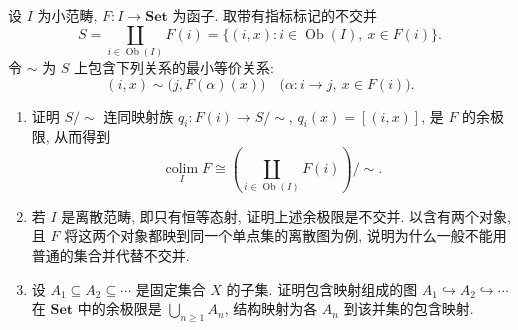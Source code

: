 \documentclass{article}
\begin{document}
\begin{problem}
设 $I$ 为小范畴, $F:I\to\mathbf{Set}$ 为函子. 取带有指标标记的不交并
\[
  S=\coprod_{i\in\operatorname{Ob}(I)}F(i)=\{(i,x):i\in\operatorname{Ob}(I),\ x\in F(i)\}.
\]
令 $\sim$ 为 $S$ 上包含下列关系的最小等价关系:
\[
  (i,x)\sim\bigl(j,F(\alpha)(x)\bigr)\quad\bigl(\alpha:i\to j,\ x\in F(i)\bigr).
\]
\begin{enumerate}
  \item[(a)] 证明 $S/{\sim}$ 连同映射族 $q_i:F(i)\to S/{\sim}$, $q_i(x)=[(i,x)]$, 是 $F$ 的余极限, 从而得到
  \[
    \operatorname*{colim}_I F\cong\left(\coprod_{i\in\operatorname{Ob}(I)}F(i)\right)\!/{\sim}.
  \]
  \item[(b)] 若 $I$ 是离散范畴, 即只有恒等态射, 证明上述余极限是不交并. 以含有两个对象, 且 $F$ 将这两个对象都映到同一个单点集的离散图为例, 说明为什么一般不能用普通的集合并代替不交并.
  \item[(c)] 设 $A_1\subseteq A_2\subseteq\cdots$ 是固定集合 $X$ 的子集. 证明包含映射组成的图 $A_1\hookrightarrow A_2\hookrightarrow\cdots$ 在 $\mathbf{Set}$ 中的余极限是 $\bigcup_{n\ge1}A_n$, 结构映射为各 $A_n$ 到该并集的包含映射.
\end{enumerate}
\end{problem}
\end{document}
